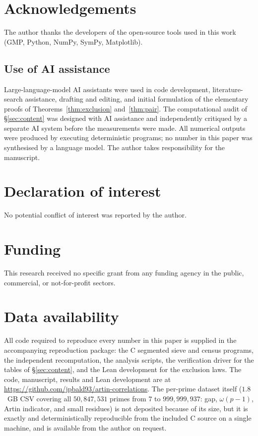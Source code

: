\section*{Acknowledgements}
The author thanks the developers of the open-source tools used in this work
(GMP, Python, NumPy, SymPy, Matplotlib).

\subsection*{Use of AI assistance}
Large-language-model AI assistants were used in code development, literature-search
assistance, drafting and editing, and initial formulation of the elementary proofs of
Theorems~\ref{thm:exclusion} and~\ref{thm:pair}. The computational audit of
\S\ref{sec:content} was designed with AI assistance and independently critiqued by a
separate AI system before the measurements were made. All numerical outputs were produced by
executing deterministic programs; no number in this paper was synthesised by a language
model. The author takes responsibility for the manuscript.

\section*{Declaration of interest}
No potential conflict of interest was reported by the author.

\section*{Funding}
This research received no specific grant from any funding agency in the public, commercial,
or not-for-profit sectors.

\section*{Data availability}
All code required to reproduce every number in this paper is supplied in the accompanying
reproduction package: the C segmented sieve and census programs, the independent
recomputation, the analysis scripts, the verification driver for the tables of
\S\ref{sec:content}, and the Lean development for the exclusion laws. The code, manuscript,
results and Lean development are at
\url{https://github.com/jpbald93/artin-correlations}. The per-prime dataset itself
($1.8$~GB CSV covering all $50{,}847{,}531$ primes from $7$ to $999{,}999{,}937$: gap,
$\omega(p-1)$, Artin indicator, and small residues) is not deposited because of its size,
but it is exactly and deterministically reproducible from the included C source on a single
machine, and is available from the author on request.
